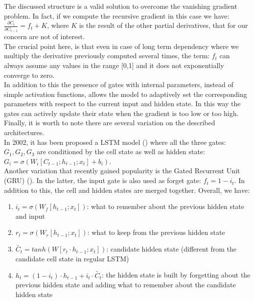 \documentclass[LaM,binding=0.6cm]{sapthesis}
\begin{document}
The discussed structure is a valid solution to overcome the vanishing gradient problem. In fact, if we compute the recursive gradient in this case we have: $\frac{\partial C_t}{\partial C_{t-1}} = f_t + K$, where $K$ is the result of the other partial derivatives, that for our concern are not of interest.\\The crucial point here, is that even in case of long term dependency where we multiply the derivative previously computed several times, the term: $f_t$ can always assume any values in the range [0,1] and it does not exponentially converge to zero.\\In addition to this the presence of gates with internal parameters, instead of simple activation functions, allows the model to adaptively set the corresponding parameters with respect to the current input and hidden state. In this way the gates can actively update their state when the gradient is too low or too high.\\Finally, it is worth to note there are several variation on the described architectures.\\In 2002, it has been proposed a LSTM model (\cite{lstmv1}) where all the three gates:$G_1,G_2,G_3$ are conditioned by the cell state as well as hidden state: $G_i=\sigma(W_i[C_{t-1};h_{t-1};x_t]+b_i)$.\\Another variation that recently gained popularity is the Gated Recurrent Unit (GRU) (\cite{grupaper}). In the latter, the input gate is also used as forget gate: $f_t=1-i_t$. In addition to this, the cell and hidden states are merged together. Overall, we have:
\begin{enumerate}
\item $i_t=\sigma(W_f[h_{t-1};x_t])$: what to remember about the previous hidden state and input
\item $r_t=\sigma(W_r[h_{t-1};x_t])$: what to keep from the previous hidden state  
\item $\widetilde{C_t}=tanh(W [r_t\cdot h_{t-1};x_t])$: candidate hidden state (different from the candidate cell state in regular LSTM)
\item $h_t=(1-i_t)\cdot h_{t-1}+i_t\cdot\widetilde{C_t}$: the hidden state is built by forgetting about the previous hidden state and  adding what to remember about the candidate hidden state
\end{enumerate}






 
\end{document}
